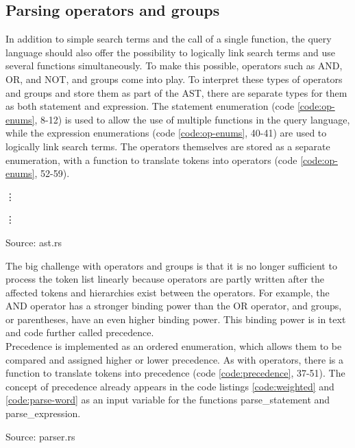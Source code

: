 \subsection{Parsing operators and groups}
In addition to simple search terms and the call of a single function, the query language should also offer the possibility to logically link search terms and use several functions simultaneously. To make this possible, operators such as AND, OR, and NOT, and groups come into play. To interpret these types of operators and groups and store them as part of the \ac{AST}, there are separate types for them as both statement and expression. The statement enumeration (code \ref{code:op-enums}, 8-12) is used to allow the use of multiple functions in the query language, while the expression enumerations (code \ref{code:op-enums}, 40-41) are used to logically link search terms. The operators themselves are stored as a separate enumeration, with a function to translate tokens into operators (code \ref{code:op-enums}, 52-59).
\begin{codeenv}
    \label{code:op-enums}
    
    \vdots
    
    \vdots
    
    \centerline{Source: ast.rs}
\end{codeenv}
The big challenge with operators and groups is that it is no longer sufficient to process the token list linearly because operators are partly written after the affected tokens and hierarchies exist between the operators. For example, the AND operator has a stronger binding power than the OR operator, and groups, or parentheses, have an even higher binding power. This binding power is in text and code further called precedence.\\
Precedence is implemented as an ordered enumeration, which allows them to be compared and assigned higher or lower precedence. As with operators, there is a function to translate tokens into precedence (code \ref{code:precedence}, 37-51). The concept of precedence already appears in the code listings \ref{code:weighted} and \ref{code:parse-word} as an input variable for the functions parse\_statement and parse\_expression.
\begin{codeenv}
    \label{code:precedence}
    
    \centerline{Source: parser.rs}
\end{codeenv}
